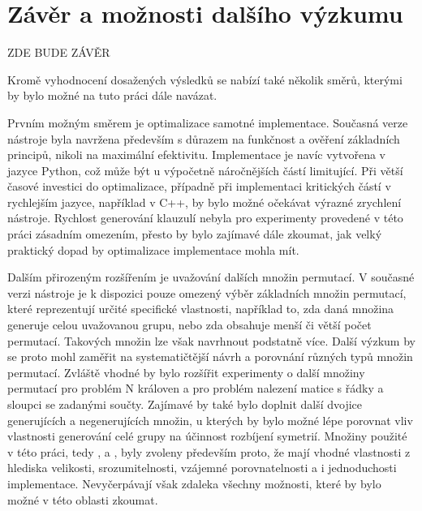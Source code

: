 \chapter*{Závěr a možnosti dalšího výzkumu}

ZDE BUDE ZÁVĚR

Kromě vyhodnocení dosažených výsledků se nabízí také několik směrů, kterými by
bylo možné na tuto práci dále navázat.

Prvním možným směrem je optimalizace samotné implementace. Současná verze
nástroje byla navržena především s důrazem na funkčnost a ověření základních
principů, nikoli na maximální efektivitu. Implementace je navíc vytvořena v jazyce
Python, což může být u výpočetně náročnějších částí limitující. Při větší časové
investici do optimalizace, případně při implementaci kritických částí v rychlejším
jazyce, například v C++, by bylo možné očekávat výrazné zrychlení nástroje.
Rychlost generování klauzulí nebyla pro experimenty provedené v této práci
zásadním omezením, přesto by bylo zajímavé dále zkoumat, jak velký praktický
dopad by optimalizace implementace mohla mít.

Dalším přirozeným rozšířením je uvažování dalších množin permutací. V současné
verzi nástroje je k dispozici pouze omezený výběr základních množin permutací,
které reprezentují určité specifické vlastnosti, například to, zda daná množina
generuje celou uvažovanou grupu, nebo zda obsahuje menší či větší počet permutací.
Takových množin lze však navrhnout podstatně více. Další výzkum by se proto
mohl zaměřit na systematičtější návrh a porovnání různých typů množin permutací.
Zvláště vhodné by bylo rozšířit experimenty o další množiny permutací pro problém
N královen a pro problém nalezení matice s řádky a sloupci se zadanými součty.
Zajímavé by také bylo doplnit další dvojice generujících a
negenerujících množin, u kterých by bylo možné lépe porovnat vliv vlastnosti
generování celé grupy na účinnost rozbíjení symetrií. Množiny použité v této práci,
tedy ,  a , byly zvoleny především
proto, že mají vhodné vlastnosti z hlediska velikosti, srozumitelnosti, vzájemné porovnatelnosti a i jednoduchosti implementace.
Nevyčerpávají však zdaleka všechny možnosti, které by bylo možné v této oblasti zkoumat.

